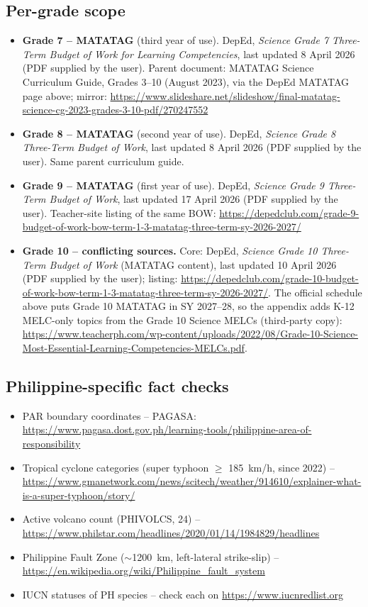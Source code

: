 \subsection*{Per-grade scope}
\begin{itemize}[leftmargin=1.2em]
\item \textbf{Grade 7 -- MATATAG} (third year of use). DepEd, \emph{Science Grade 7 Three-Term Budget of Work for Learning Competencies}, last updated 8 April 2026 (PDF supplied by the user). Parent document: MATATAG Science Curriculum Guide, Grades 3--10 (August 2023), via the DepEd MATATAG page above; mirror: \url{https://www.slideshare.net/slideshow/final-matatag-science-cg-2023-grades-3-10-pdf/270247552}
\item \textbf{Grade 8 -- MATATAG} (second year of use). DepEd, \emph{Science Grade 8 Three-Term Budget of Work}, last updated 8 April 2026 (PDF supplied by the user). Same parent curriculum guide.
\item \textbf{Grade 9 -- MATATAG} (first year of use). DepEd, \emph{Science Grade 9 Three-Term Budget of Work}, last updated 17 April 2026 (PDF supplied by the user). Teacher-site listing of the same BOW: \url{https://depedclub.com/grade-9-budget-of-work-bow-term-1-3-matatag-three-term-sy-2026-2027/}
\item \textbf{Grade 10 -- conflicting sources.} Core: DepEd, \emph{Science Grade 10 Three-Term Budget of Work} (MATATAG content), last updated 10 April 2026 (PDF supplied by the user); listing: \url{https://depedclub.com/grade-10-budget-of-work-bow-term-1-3-matatag-three-term-sy-2026-2027/}. The official schedule above puts Grade 10 MATATAG in SY 2027--28, so the appendix adds K-12 MELC-only topics from the Grade 10 Science MELCs (third-party copy): \url{https://www.teacherph.com/wp-content/uploads/2022/08/Grade-10-Science-Most-Essential-Learning-Competencies-MELCs.pdf}. 
\end{itemize}

\subsection*{Philippine-specific fact checks}
\begin{itemize}[leftmargin=1.2em]
\item PAR boundary coordinates -- PAGASA: \url{https://www.pagasa.dost.gov.ph/learning-tools/philippine-area-of-responsibility}
\item Tropical cyclone categories (super typhoon $\ge$ \SI{185}{km/h}, since 2022) -- \url{https://www.gmanetwork.com/news/scitech/weather/914610/explainer-what-is-a-super-typhoon/story/}
\item Active volcano count (PHIVOLCS, 24) -- \url{https://www.philstar.com/headlines/2020/01/14/1984829/headlines}
\item Philippine Fault Zone ($\sim$\SI{1200}{km}, left-lateral strike-slip) -- \url{https://en.wikipedia.org/wiki/Philippine_fault_system}
\item IUCN statuses of PH species -- check each on \url{https://www.iucnredlist.org}
\end{itemize}

